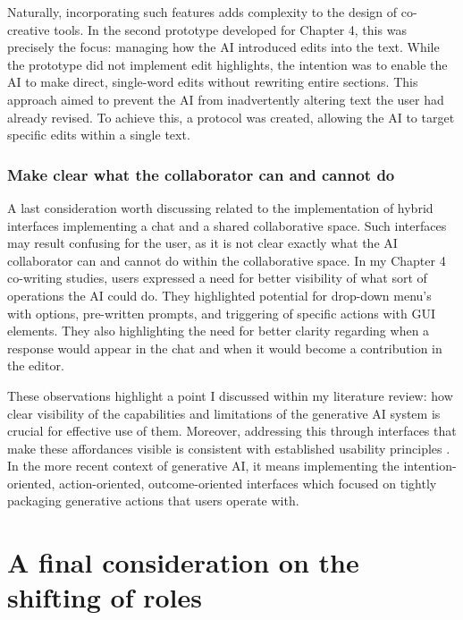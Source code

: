 Naturally, incorporating such features adds complexity to the design of co-creative tools. In the second prototype developed for Chapter 4, this was precisely the focus: managing how the AI introduced edits into the text. While the prototype did not implement edit highlights, the intention was to enable the AI to make direct, single-word edits without rewriting entire sections. This approach aimed to prevent the AI from inadvertently altering text the user had already revised. To achieve this, a protocol was created, allowing the AI to target specific edits within a single text.

\subsubsection{Make clear what the collaborator can and cannot do}

A last consideration worth discussing related to the implementation of hybrid interfaces implementing a chat and a shared collaborative space. Such interfaces may result confusing for the user, as it is not clear exactly what the AI collaborator can and cannot do within the collaborative space. In my Chapter 4 co-writing studies, users expressed a need for better visibility of what sort of operations the AI could do. They highlighted potential for drop-down menu's with options, pre-written prompts, and triggering of specific actions with GUI elements. They also highlighting the need for better clarity regarding when a response would appear in the chat and when it would become a contribution in the editor. 

These observations highlight a point I discussed within my literature review: how clear visibility of the capabilities and limitations of the generative AI system is crucial for effective use of them. Moreover, addressing this through interfaces that make these affordances visible is consistent with established usability principles \cite{Nielsen1994-df}. In the more recent context of generative AI, it means implementing the intention-oriented, action-oriented, outcome-oriented interfaces \cite{Weisz2024-io, Schaad2025-ca} which focused on tightly packaging generative actions that users operate with. 


\section{A final consideration on the shifting of roles}

